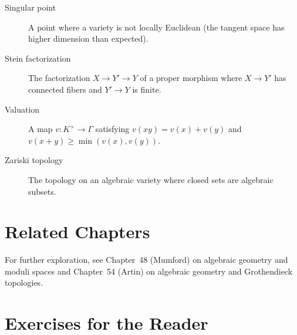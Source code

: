 \begin{description}
    \item[Singular point] A point where a variety is not locally Euclidean (the tangent space has higher dimension than expected).
    \item[Stein factorization] The factorization $X \to Y' \to Y$ of a proper morphism where $X \to Y'$ has connected fibers and $Y' \to Y$ is finite.
    \item[Valuation] A map $v: K^\times \to \Gamma$ satisfying $v(xy) = v(x) + v(y)$ and $v(x+y) \geq \min(v(x), v(y))$.
    \item[Zariski topology] The topology on an algebraic variety where closed sets are algebraic subsets.
\end{description}

\section{Related Chapters}
For further exploration, see Chapter~48 (Mumford) on algebraic geometry and moduli spaces and Chapter~54 (Artin) on algebraic geometry and Grothendieck topologies.

\section*{Exercises for the Reader}

